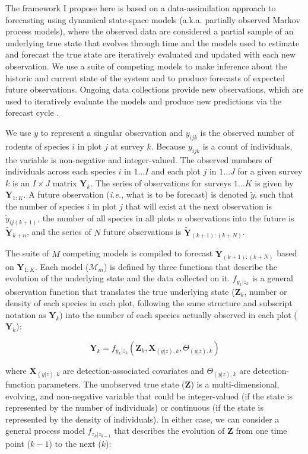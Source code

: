 \documentclass{article}
\begin{document}
The framework I propose here is based on a data-assimilation approach to forecasting using dynamical state-space models (a.k.a. partially observed Markov process models), where the observed data are considered a partial sample of an underlying true state that evolves through time \citep{Ionides2006, King2016} and the models used to estimate and forecast the true state are iteratively evaluated and updated with each new observation. We use a suite of competing models to make inference about the historic and current state of the system and to produce forecasts of expected future observations. Ongoing data collections provide new observations, which are used to iteratively evaluate the models and produce new predictions via the forecast cycle \citep{Dietze2017}. 

We use $y$ to represent a singular observation and $y_{ijk}$ is the observed number of rodents of species $i$ in plot $j$ at survey $k$. Because $y_{ijk}$ is a count of individuals, the variable is non-negative and integer-valued. The observed numbers of individuals across each species $i$ in $1 \ldots I$ and each plot $j$ in $1 \ldots J$ for a given survey $k$ is an $I \times J$ matrix $\textbf{Y}_k$. The series of observations for surveys $1 \ldots K$ is given by $\textbf{Y}_{1:K}$. A future observation (\emph{i.e.}, what is to be forecast) is denoted $\tilde{y}$, such that the number of species $i$ in plot $j$ that will exist at the next observation is $\tilde{y}_{ij(k+1)}$, the number of all species in all plots $n$ observations into the future is $\tilde{\textbf{Y}}_{k+n}$, and the series of $N$ future observations is $\tilde{\textbf{Y}}_{(k+1):(k+N)}$.

The suite of $M$ competing models is compiled to forecast $\tilde{\textbf{Y}}_{(k+1):(k+N)}$ based on $\textbf{Y}_{1:K}$. Each model ($\mathcal{M}_m$) is defined by three functions that describe the evolution of the underlying state and the data collected on it. $f_{y_k|z_k}$ is a general observation function that translates the true underlying state ($\textbf{Z}_k$, number or density of each species in each plot, following the same structure and subscript notation as $\textbf{Y}_k$) into the number of each species actually observed in each plot ($\textbf{Y}_k$):

\begin{equation}
\textbf{Y}_k = f_{y_k|z_k}(\textbf{Z}_k, \textbf{X}_{(y|z), k}, \Theta_{(y|z), k})
\end{equation}

where $\textbf{X}_{(y|z), k}$ are detection-associated covariates and $\Theta_{(y|z), k}$ are detection-function parameters. The unobserved true state ($\textbf{Z}$) is a multi-dimensional, evolving, and non-negative variable that could be integer-valued (if the state is represented by the number of individuals) or continuous (if the state is represented by the density of individuals). In either case, we can consider a general process model $f_{z_k|z_{k-1}}$ that describes the evolution of $\textbf{Z}$ from one time point ($k-1$) to the next ($k$):
\end{document}
